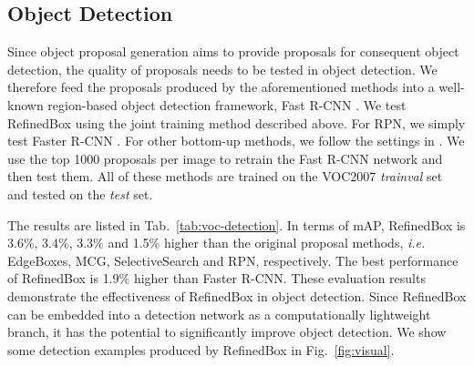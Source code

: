 \documentclass[letterpaper]{article} %
\newcommand{\figref}[1]{Fig.~\ref{#1}}
\newcommand{\tabref}[1]{Tab.~\ref{#1}}
\def\ie{\emph{i.e.~}}
\begin{document}
\subsection{Object Detection}
%
Since object proposal generation aims to provide proposals
for consequent object detection, the quality of proposals
needs to be tested in object detection.
We therefore feed the proposals produced by the aforementioned
methods into a well-known region-based object detection framework,
Fast R-CNN \cite{girshick2015fast}.
We test RefinedBox using the joint training method described above.
For RPN, we simply test Faster R-CNN \cite{ren2015faster}.
For other bottom-up methods, we follow the settings
in \cite{zhang2017sequential}.
We use the top 1000 proposals per image to retrain the Fast R-CNN
network and then test them.
All of these methods are trained on the VOC2007 \textit{trainval} set
and tested on the \textit{test} set.


The results are listed in \tabref{tab:voc-detection}.
In terms of mAP, RefinedBox is 3.6\%, 3.4\%,
3.3\% and 1.5\% higher than the original proposal methods, \ie
EdgeBoxes, MCG, SelectiveSearch and RPN, respectively.
The best performance of RefinedBox is 1.9\% higher than Faster R-CNN.
These evaluation results demonstrate the effectiveness of RefinedBox
in object detection.
Since RefinedBox can be embedded into a detection network as a
computationally lightweight branch, it has the potential to significantly
improve object detection.
We show some detection examples produced by RefinedBox in \figref{fig:visual}.



\end{document}
